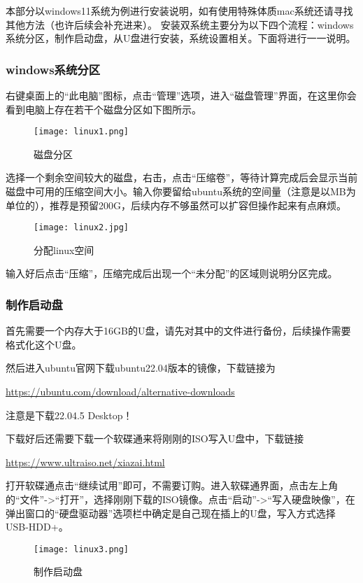 本部分以windows11系统为例进行安装说明，如有使用特殊体质mac系统还请寻找其他方法（也许后续会补充进来）。
安装双系统主要分为以下四个流程：windows系统分区，制作启动盘，从U盘进行安装，系统设置相关。下面将进行一一说明。
\subsubsection{windows系统分区}
右键桌面上的“此电脑”图标，点击“管理”选项，进入“磁盘管理”界面，在这里你会看到电脑上存在若干个磁盘分区如下图所示。

\begin{figure}[H]
    \centering
    \texttt{[image: linux1.png]}
    \caption{磁盘分区} %
    \label{fig:linux1} %
\end{figure}

选择一个剩余空间较大的磁盘，右击，点击“压缩卷”，等待计算完成后会显示当前磁盘中可用的压缩空间大小。输入你要留给ubuntu系统的空间量（注意是以MB为单位的），推荐是预留200G，后续内存不够虽然可以扩容但操作起来有点麻烦。

\begin{figure}[H]
    \centering
    \texttt{[image: linux2.jpg]}
    \caption{分配linux空间} %
    \label{fig:linux2} %
\end{figure}

输入好后点击“压缩”，压缩完成后出现一个“未分配”的区域则说明分区完成。

\subsubsection{制作启动盘}
首先需要一个内存大于16GB的U盘，请先对其中的文件进行备份，后续操作需要格式化这个U盘。

然后进入ubuntu官网下载ubuntu22.04版本的镜像，下载链接为

\url{https://ubuntu.com/download/alternative-downloads}

注意是下载22.04.5 Desktop！

下载好后还需要下载一个软碟通来将刚刚的ISO写入U盘中，下载链接

\url{https://www.ultraiso.net/xiazai.html} 

打开软碟通点击“继续试用”即可，不需要订购。进入软碟通界面，点击左上角的“文件”-\textgreater“打开”，选择刚刚下载的ISO镜像。点击“启动”-\textgreater“写入硬盘映像”，在弹出窗口的“硬盘驱动器”选项栏中确定是自己现在插上的U盘，写入方式选择USB-HDD+。

\begin{figure}[H]
    \centering
    \texttt{[image: linux3.png]}
    \caption{制作启动盘} %
    \label{fig:linux3} %
\end{figure}

